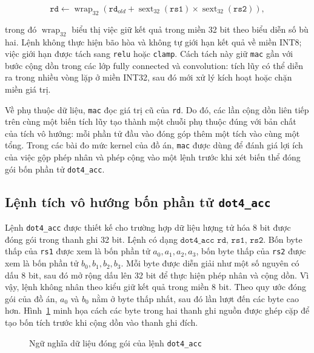 \documentclass[../DoAn.tex]{subfiles}
\begin{document}
\begin{equation}
    \texttt{rd} \leftarrow \operatorname{wrap}_{32}
    \left(\texttt{rd}_{old} + \operatorname{sext}_{32}(\texttt{rs1}) \times \operatorname{sext}_{32}(\texttt{rs2})\right),
    \label{eq:mac-semantics}
\end{equation}

trong đó \(\operatorname{wrap}_{32}\) biểu thị việc giữ kết quả trong miền 32 bit theo biểu diễn số bù hai. Lệnh không thực hiện bão hòa và không tự giới hạn kết quả về miền INT8; việc giới hạn được tách sang \texttt{relu} hoặc \texttt{clamp}. Cách tách này giữ \texttt{mac} gần với bước cộng dồn trong các lớp fully connected và convolution: tích lũy có thể diễn ra trong nhiều vòng lặp ở miền INT32, sau đó mới xử lý kích hoạt hoặc chặn miền giá trị.

Về phụ thuộc dữ liệu, \texttt{mac} đọc giá trị cũ của \texttt{rd}. Do đó, các lần cộng dồn liên tiếp trên cùng một biến tích lũy tạo thành một chuỗi phụ thuộc đúng với bản chất của tích vô hướng: mỗi phần tử đầu vào đóng góp thêm một tích vào cùng một tổng. Trong các bài đo mức kernel của đồ án, \texttt{mac} được dùng để đánh giá lợi ích của việc gộp phép nhân và phép cộng vào một lệnh trước khi xét biến thể đóng gói bốn phần tử \texttt{dot4\_acc}.

\subsection{Lệnh tích vô hướng bốn phần tử \texttt{dot4\_acc}}
\label{subsec:dac-ta-dot4-acc}

Lệnh \texttt{dot4\_acc} được thiết kế cho trường hợp dữ liệu lượng tử hóa 8 bit được đóng gói trong thanh ghi 32 bit. Lệnh có dạng \(\texttt{dot4\_acc rd, rs1, rs2}\). Bốn byte thấp của \texttt{rs1} được xem là bốn phần tử \(a_0,a_1,a_2,a_3\), bốn byte thấp của \texttt{rs2} được xem là bốn phần tử \(b_0,b_1,b_2,b_3\). Mỗi byte được diễn giải như một số nguyên có dấu 8 bit, sau đó mở rộng dấu lên 32 bit để thực hiện phép nhân và cộng dồn. Vì vậy, lệnh không nhân theo kiểu giữ kết quả trong miền 8 bit. Theo quy ước đóng gói của đồ án, \(a_0\) và \(b_0\) nằm ở byte thấp nhất, sau đó lần lượt đến các byte cao hơn. Hình~\ref{fig:dot4-acc-semantics} minh họa cách các byte trong hai thanh ghi nguồn được ghép cặp để tạo bốn tích trước khi cộng dồn vào thanh ghi đích.

\begin{figure}[H]
    \centering
    
    \caption{Ngữ nghĩa dữ liệu đóng gói của lệnh \texttt{dot4\_acc}}
    \label{fig:dot4-acc-semantics}
\end{figure}
\end{document}
